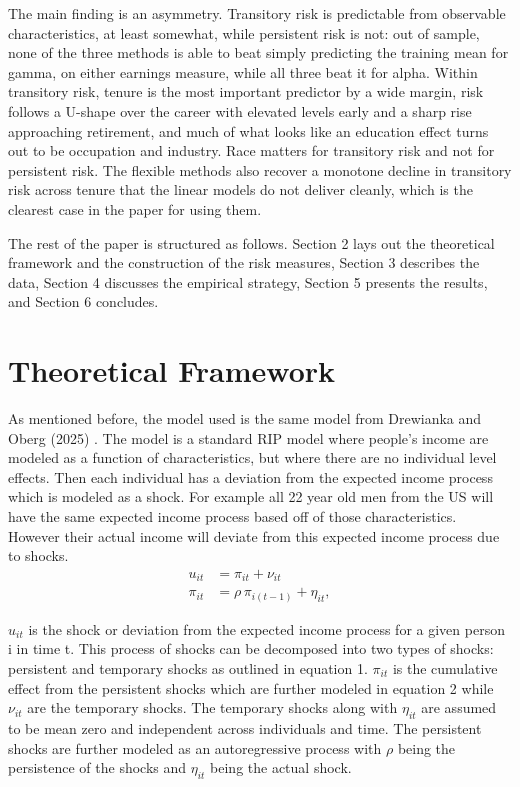 \documentclass[12pt]{article}
\begin{document}
\begin{onehalfspace}
The main finding is an asymmetry. Transitory risk is predictable from observable characteristics, at least somewhat, while persistent risk is not: out of sample, none of the three methods is able to beat simply predicting the training mean for gamma, on either earnings measure, while all three beat it for alpha. Within transitory risk, tenure is the most important predictor by a wide margin, risk follows a U-shape over the career with elevated levels early and a sharp rise approaching retirement, and much of what looks like an education effect turns out to be occupation and industry. Race matters for transitory risk and not for persistent risk. The flexible methods also recover a monotone decline in transitory risk across tenure that the linear models do not deliver cleanly, which is the clearest case in the paper for using them.

The rest of the paper is structured as follows. Section 2 lays out the theoretical framework and the construction of the risk measures, Section 3 describes the data, Section 4 discusses the empirical strategy, Section 5 presents the results, and Section 6 concludes.


\section{Theoretical Framework}


As mentioned before, the model used is the same model from Drewianka and Oberg (2025) \cite{drewianka2025}. The model is a standard RIP model where people's income are modeled as a function of characteristics, but where there are no individual level effects. Then each individual has a deviation from the expected income process which is modeled as a shock. For example all 22 year old men from the US will have the same expected income process based off of those characteristics. However their actual income will deviate from this expected income process due to shocks. 
\vspace{-0.75cm} %
\begin{align}
u_{it} 
&= \pi_{it} + \nu_{it} \\[1ex]
\pi_{it} 
&= \rho\,\pi_{i(t-1)} + \eta_{it},
\end{align}

\vspace{-0.25cm}

$u_{it}$ is the shock or deviation from the expected income process for a given person i in time t. This process of shocks can be decomposed into two types of shocks: persistent and temporary shocks as outlined in equation 1. $\pi_{it}$ is the cumulative effect from the persistent shocks which are further modeled in equation 2 while $\nu_{it}$ are the temporary shocks. The temporary shocks along with $\eta_{it}$ are assumed to be mean zero and independent across individuals and time. The persistent shocks are further modeled as an autoregressive process with $\rho$ being the persistence of the shocks and $\eta_{it}$ being the actual shock.


\end{onehalfspace}
\end{document}
